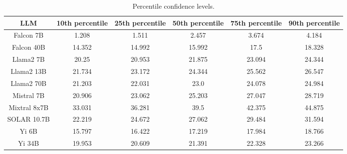 \begin{table*}
\centering
\begin{tabular}{c|c|c|c|c|c}
LLM & 10th percentile & 25th percentile & 50th percentile & 75th percentile & 90th percentile\\ \hline
Falcon 7B & 1.208 & 1.511 & 2.457 & 3.674 & 4.184\\
Falcon 40B & 14.352 & 14.992 & 15.992 & 17.5 & 18.328\\
Llama2 7B & 20.25 & 20.953 & 21.875 & 23.094 & 24.344\\
Llama2 13B & 21.734 & 23.172 & 24.344 & 25.562 & 26.547\\
Llama2 70B & 21.203 & 22.031 & 23.0 & 24.078 & 24.984\\
Mistral 7B & 20.906 & 23.062 & 25.203 & 27.047 & 28.719\\
Mixtral 8x7B & 33.031 & 36.281 & 39.5 & 42.375 & 44.875\\
SOLAR 10.7B & 22.219 & 24.672 & 27.062 & 29.484 & 31.594\\
Yi 6B & 15.797 & 16.422 & 17.219 & 17.984 & 18.766\\
Yi 34B & 19.953 & 20.609 & 21.391 & 22.328 & 23.266\\
\hline
\end{tabular}
\caption{Percentile confidence levels.}
\label{tab:percentile_conf}
\end{table*}
